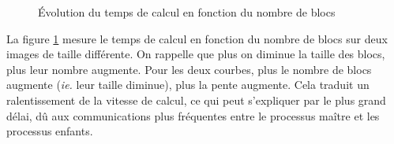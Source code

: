 \begin{figure}
  \centering


  \caption{Évolution du temps de calcul en fonction du nombre de
    blocs}
  \label{fig:mandel:dyn:nblocks}
\end{figure}

La figure \ref{fig:mandel:dyn:nblocks} mesure le temps de calcul en
fonction du nombre de blocs sur deux images de taille différente. On
rappelle que plus on diminue la taille des blocs, plus leur nombre
augmente. Pour les deux courbes, plus le nombre de blocs augmente
(\emph{ie.} leur taille diminue), plus la pente augmente. Cela
traduit un ralentissement de la vitesse de calcul, ce qui peut
s'expliquer par le plus grand délai, dû aux communications plus
fréquentes entre le processus maître et les processus enfants.


